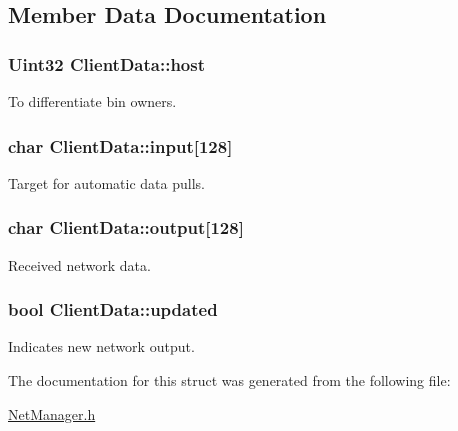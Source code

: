 \subsection{Member Data Documentation}
\hypertarget{structClientData_a80800ab1be736113d72ae920e2c206e5}{
\subsubsection[{host}]{\setlength{\rightskip}{0pt plus 5cm}Uint32 Client\-Data\-::host}}\label{structClientData_a80800ab1be736113d72ae920e2c206e5}


To differentiate bin owners. 

\hypertarget{structClientData_ac35c0f10a3464940d3cc884b384ff2f4}{
\subsubsection[{input}]{\setlength{\rightskip}{0pt plus 5cm}char Client\-Data\-::input\mbox{[}128\mbox{]}}}\label{structClientData_ac35c0f10a3464940d3cc884b384ff2f4}


Target for automatic data pulls. 

\hypertarget{structClientData_a9a56c37fe0e6a3dea909ab4efc7090b7}{
\subsubsection[{output}]{\setlength{\rightskip}{0pt plus 5cm}char Client\-Data\-::output\mbox{[}128\mbox{]}}}\label{structClientData_a9a56c37fe0e6a3dea909ab4efc7090b7}


Received network data. 

\hypertarget{structClientData_ac6a00858b77772f89feb087a87004176}{
\subsubsection[{updated}]{\setlength{\rightskip}{0pt plus 5cm}bool Client\-Data\-::updated}}\label{structClientData_ac6a00858b77772f89feb087a87004176}


Indicates new network output. 



The documentation for this struct was generated from the following file\-:\begin{DoxyCompactItemize}
\item 
\hyperlink{NetManager_8h}{Net\-Manager.\-h}\end{DoxyCompactItemize}
